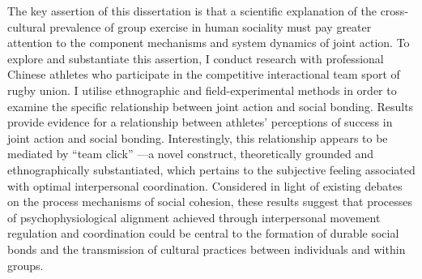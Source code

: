 The key assertion of this dissertation is that a scientific explanation of the cross-cultural prevalence of group exercise in human sociality must pay greater attention to the component mechanisms and system dynamics of joint action. To explore and substantiate this assertion, I conduct research with professional Chinese athletes who participate in the competitive interactional team sport of rugby union.  I utilise ethnographic and field-experimental methods in order to examine the specific relationship between joint action and social bonding.  Results provide evidence for a relationship between athletes' perceptions of success in joint action and social bonding.  Interestingly, this relationship appears to be mediated by ``team click'' ---a novel construct, theoretically grounded and ethnographically substantiated, which pertains to the subjective feeling associated with optimal interpersonal coordination.  Considered in light of existing debates on the process mechanisms of social cohesion, these results suggest that processes of psychophysiological alignment achieved through interpersonal movement regulation and coordination could be central to the formation of durable social bonds and the transmission of cultural practices between individuals and within groups.
